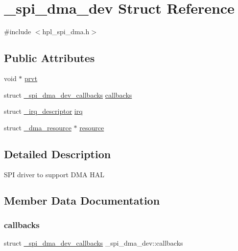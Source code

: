 \hypertarget{struct__spi__dma__dev}{}\section{\+\_\+spi\+\_\+dma\+\_\+dev Struct Reference}
\label{struct__spi__dma__dev}


{\ttfamily \#include $<$hpl\+\_\+spi\+\_\+dma.\+h$>$}

\subsection*{Public Attributes}
\begin{DoxyCompactItemize}
\item 
void $\ast$ \hyperlink{struct__spi__dma__dev_a79d51491e26afd692bd0dd65c8db74fc}{prvt}
\item 
struct \hyperlink{struct__spi__dma__dev__callbacks}{\+\_\+spi\+\_\+dma\+\_\+dev\+\_\+callbacks} \hyperlink{struct__spi__dma__dev_abcfca34e7f3d543ca7efae8752426407}{callbacks}
\item 
struct \hyperlink{struct__irq__descriptor}{\+\_\+irq\+\_\+descriptor} \hyperlink{struct__spi__dma__dev_a1f0425472993f98835f532b416c94a78}{irq}
\item 
struct \hyperlink{struct__dma__resource}{\+\_\+dma\+\_\+resource} $\ast$ \hyperlink{struct__spi__dma__dev_ab42c62f8953608163ed836688813697d}{resource}
\end{DoxyCompactItemize}


\subsection{Detailed Description}
S\+PI driver to support D\+MA H\+AL 

\subsection{Member Data Documentation}
\mbox{\label{struct__spi__dma__dev_abcfca34e7f3d543ca7efae8752426407}} 
\subsubsection{\texorpdfstring{callbacks}{callbacks}}
{\footnotesize\ttfamily struct \hyperlink{struct__spi__dma__dev__callbacks}{\+\_\+spi\+\_\+dma\+\_\+dev\+\_\+callbacks} \+\_\+spi\+\_\+dma\+\_\+dev\+::callbacks}

